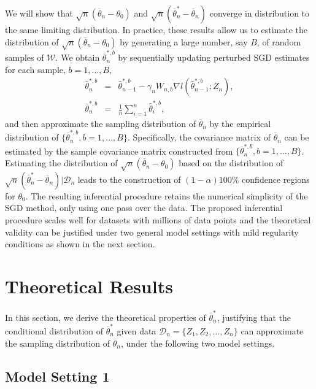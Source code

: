 \documentclass[12pt]{article}
\def\wh{\widehat}
\def\ol{\overline}
\begin{document}
We will show that $\sqrt{n}(\ol{\theta}_n-{\theta}_0)$ and $\sqrt{n}(\ol{\theta}^*_n-\ol{\theta}_n)$ converge in distribution to the same limiting distribution. In practice, these results allow us to estimate the distribution of $\sqrt{n}(\ol{\theta}_n-{\theta}_0)$ by generating a large number, say $B$, of random samples of $\mathcal{W}$. We obtain  $\ol{\theta}^{*,b}_n$ by sequentially updating perturbed SGD estimates for each sample, $b=1, \dots, B$,
 \begin{eqnarray}
 \wh{\theta}^{*,b}_n&=&\wh{\theta}^{*,b}_{n-1}-\gamma_nW_{n,b}\nabla l(\wh{\theta}^{*,b}_{n-1}; Z_n),\label{SGD-wt-b}\\
 \ol{\theta}^{*,b}_n&=&\frac{1}{n}\sum_{i=1}^n\wh{\theta}^{*,b}_i,\label{SGD-avg-wt-b}
 \end{eqnarray}
and then approximate the sampling distribution of $\ol{\theta}_n$ by the empirical distribution of $\{\ol{\theta}^{*,b}_n,b = 1,...,B\}$. Specifically, the covariance matrix of $\ol{\theta}_n$ can be estimated by the sample covariance matrix constructed from $\{\ol{\theta}^{*,b}_n,b = 1,...,B\}$. Estimating the distribution of $\sqrt{n}(\ol{\theta}_n-{\theta}_0)$ based on the distribution of $\sqrt{n}(\ol{\theta}^*_n-\ol{\theta}_n)|\mathcal{D}_n$ leads to the construction of $(1-\alpha)100\%$ confidence regions for $\theta_0$. The resulting inferential procedure retains the numerical simplicity of the SGD method, only using one pass over the data. The proposed inferential procedure scales well for datasets with millions of data points and the theoretical validity can be justified under two general model settings with mild regularity conditions as shown in the next section.

\section{Theoretical Results}

In this section, we derive the theoretical properties of $\ol{\theta}_n^*$, justifying that the conditional distribution of $\ol{\theta}_n^*$ given data $\mathcal{D}_n=\{Z_1, Z_2, \dots, Z_n\}$ can approximate the sampling distribution of $\ol{\theta}_n$, under the following two model settings.

\subsection{Model Setting 1}
\end{document}
